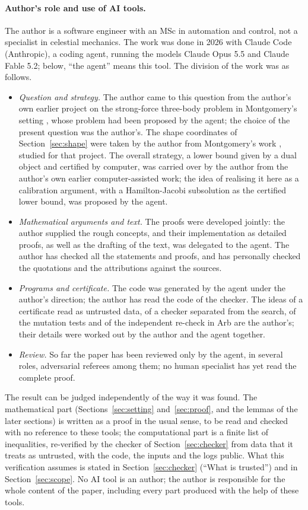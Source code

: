 \documentclass[11pt]{article}
\theoremstyle{definition}
\begin{document}
\paragraph{Author's role and use of AI tools.} The author is a software engineer with an MSc in automation and
control, not a specialist in celestial mechanics. The work was done in 2026 with Claude Code (Anthropic), a coding
agent, running the models Claude Opus 5.5 and Claude Fable 5.2; below, ``the agent'' means this tool. The division of the work
was as follows.
\begin{itemize}
\item \emph{Question and strategy.} The author came to this question from the author's own earlier project on
the strong-force three-body problem in Montgomery's setting \cite{Mpants,Waist}, whose problem had been proposed by the
agent; the choice of the present question was the author's. The shape coordinates of Section~\ref{sec:shape} were
taken by the author from Montgomery's work \cite{Mpants}, studied for that project. The overall strategy, a lower bound
given by a dual object and certified by computer, was carried over by the author from the author's own earlier computer-assisted work;
the idea of realising it here as a calibration argument, with a Hamilton-Jacobi subsolution as the certified lower
bound, was proposed by the agent.
\item \emph{Mathematical arguments and text.} The proofs were developed jointly: the author supplied the rough
concepts, and their implementation as detailed proofs, as well as the drafting of the text, was delegated to the agent.
The author has checked all the statements and proofs, and has personally checked the quotations and the attributions
against the sources.
\item \emph{Programs and certificate.} The code was generated by the agent under the author's direction; the author
has read the code of the checker. The ideas of a certificate read as untrusted data, of a checker separated from the
search, of the mutation tests and of the independent re-check in Arb are the author's; their details were worked out
by the author and the agent together.
\item \emph{Review.} So far the paper has been reviewed only by the agent, in several roles, adversarial referees
among them; no human specialist has yet read the complete proof.
\end{itemize}
The result can be judged independently of the way it was found. The mathematical part
(Sections~\ref{sec:setting} and~\ref{sec:proof}, and the lemmas of the later sections) is written as a proof in the
usual sense, to be read and checked with no reference to these tools; the computational part is a finite list of
inequalities, re-verified by the checker of Section~\ref{sec:checker} from data that it treats as untrusted, with the
code, the inputs and the logs public. What this verification assumes is stated in Section~\ref{sec:checker} (``What is
trusted'') and in Section~\ref{sec:scope}. No AI tool is an author; the author is responsible for the whole content of
the paper, including every part produced with the help of these tools.
\end{document}
